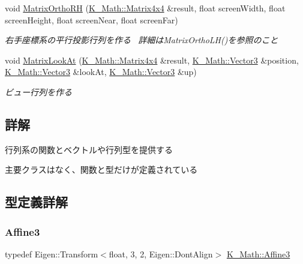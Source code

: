 \begin{DoxyCompactItemize}
void \mbox{\hyperlink{namespace_k___math_a817a68791367b9e515f7e096361ae1aa}{Matrix\+Ortho\+RH}} (\mbox{\hyperlink{namespace_k___math_a345271af9d32dff2c964bc679b13b45c}{K\+\_\+\+Math\+::\+Matrix4x4}} \&result, float screen\+Width, float screen\+Height, float screen\+Near, float screen\+Far)
\begin{DoxyCompactList}\small\item\em 右手座標系の平行投影行列を作る~\newline
詳細は\+Matrix\+Ortho\+L\+H()を参照のこと \end{DoxyCompactList}\item 
void \mbox{\hyperlink{namespace_k___math_a6b4f61bdcace7fe46cac98caa4db8931}{Matrix\+Look\+At}} (\mbox{\hyperlink{namespace_k___math_a345271af9d32dff2c964bc679b13b45c}{K\+\_\+\+Math\+::\+Matrix4x4}} \&result, \mbox{\hyperlink{namespace_k___math_a66884d78082c39ada4091c211f3570f8}{K\+\_\+\+Math\+::\+Vector3}} \&position, \mbox{\hyperlink{namespace_k___math_a66884d78082c39ada4091c211f3570f8}{K\+\_\+\+Math\+::\+Vector3}} \&look\+At, \mbox{\hyperlink{namespace_k___math_a66884d78082c39ada4091c211f3570f8}{K\+\_\+\+Math\+::\+Vector3}} \&up)
\begin{DoxyCompactList}\small\item\em ビュー行列を作る \end{DoxyCompactList}\end{DoxyCompactItemize}


\subsection{詳解}
行列系の関数とベクトルや行列型を提供する 

主要クラスはなく、関数と型だけが定義されている 

\subsection{型定義詳解}
\mbox{\label{namespace_k___math_a1de8cd5bcdc049291da842729bf45aeb}} 
\subsubsection{\texorpdfstring{Affine3}{Affine3}}
{\footnotesize\ttfamily typedef Eigen\+::\+Transform$<$float, 3, 2, Eigen\+::\+Dont\+Align$>$ \mbox{\hyperlink{namespace_k___math_a1de8cd5bcdc049291da842729bf45aeb}{K\+\_\+\+Math\+::\+Affine3}}}

